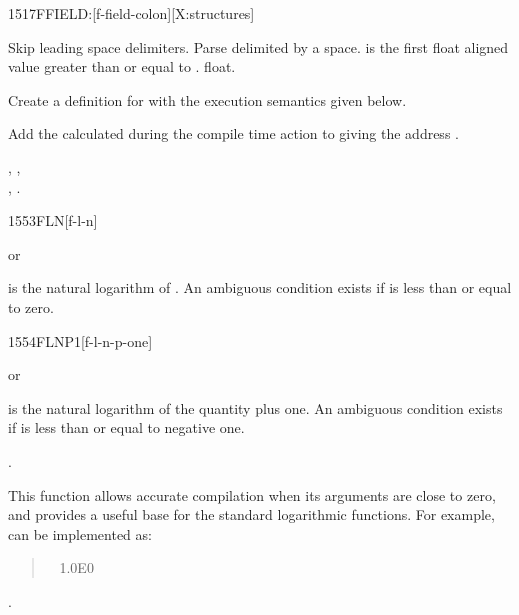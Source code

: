 
\begin{worddef}{1517}{FFIELD:}[f-field-colon][X:structures]
\item {}

	Skip leading space delimiters. Parse  delimited by
	a space.  is the first float aligned value greater
	than or equal to .   float.

	Create a definition for  with the execution semantics
	given below.

\execute[name]

	Add the  calculated during the compile time action to
	 giving the address .

\see {},
	, \\
	,
	.
\end{worddef}


\begin{worddef}{1553}{FLN}[f-l-n]
\item {} or

	 is the natural logarithm of . An ambiguous
	condition exists if  is less than or equal to zero.
\end{worddef}


\begin{worddef}{1554}{FLNP1}[f-l-n-p-one]
\item {} or

	 is the natural logarithm of the quantity 
	plus one. An ambiguous condition exists if  is less
	than or equal to negative one.

\see {}.

	\begin{rationale} %
		This function allows accurate compilation when its arguments
		are close to zero, and provides a useful base for the standard
		logarithmic functions. For example,  can be
		implemented as:

		\begin{quote}\ttfamily
			\word[core]{:}  ~
				1.0E0  ~ 
			\word[core]{;}
		\end{quote}
	\see {}.
	\end{rationale}
\end{worddef}


